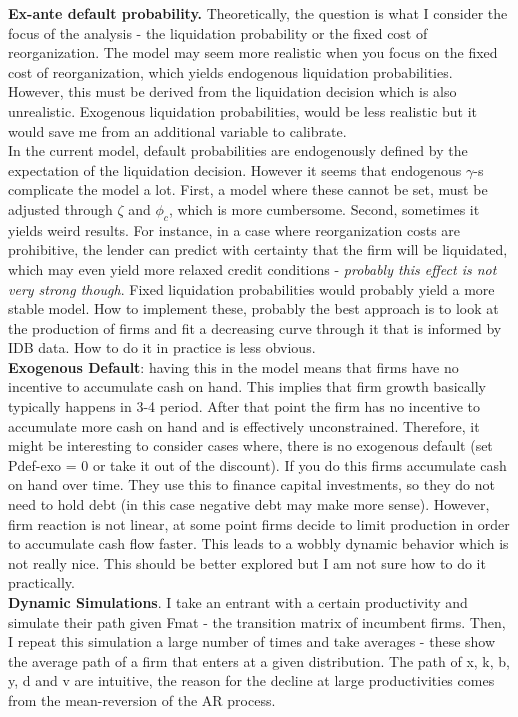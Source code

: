 \documentclass[12pt]{article}
\begin{document}
\textbf{Ex-ante default probability.} Theoretically, the question is what I consider the focus of the analysis - the liquidation probability or the fixed cost of reorganization. The model may seem more realistic when you focus on the fixed cost of reorganization, which yields endogenous liquidation probabilities. However, this must be derived from the liquidation decision which is also unrealistic. Exogenous liquidation probabilities, would be less realistic but it would save me from an additional variable to calibrate. \vspace{3mm} \\
In the current model, default probabilities are endogenously defined by the expectation of the liquidation decision. However it seems that endogenous $\gamma$-s complicate the model a lot. First, a model where these cannot be set, must be adjusted through $\zeta$ and $\phi_c$, which is more cumbersome. Second, sometimes it yields weird results. For instance, in a case where reorganization costs are prohibitive, the lender can predict with certainty that the firm will be liquidated, which may even yield more relaxed credit conditions - \textit{probably this effect is not very strong though}. Fixed liquidation probabilities would probably yield a more stable model.
How to implement these, probably the best approach is to look at the production of firms and fit a decreasing curve through it that is informed by IDB data. How to do it in practice is less obvious. \vspace{3mm} \\
\textbf{Exogenous Default}: having this in the model means that firms have no incentive to accumulate cash on hand. This implies that firm growth basically typically happens in 3-4 period. After that point the firm has no incentive to accumulate more cash on hand and is effectively unconstrained. Therefore, it might be interesting to consider cases where, there is no exogenous default (set Pdef-exo = 0 or take it out of the discount). If you do this firms accumulate cash on hand over time. They use this to finance capital investments, so they do not need to hold debt (in this case negative debt may make more sense). However, firm reaction is not linear, at some point firms decide to limit production in order to accumulate cash flow faster. This leads to a wobbly dynamic behavior which is not really nice. This should be better explored but I am not sure how to do it practically. \vspace{3mm} \\
\textbf{Dynamic Simulations}. I take an entrant with a certain productivity and simulate their path given Fmat - the transition matrix of incumbent firms. Then, I repeat this simulation a large number of times and take averages - these show the average path of a firm that enters at a given distribution. The path of x, k, b, y, d and v  are intuitive, the reason for the decline at large productivities comes from the mean-reversion of the AR process. \vspace{3mm} \\
\end{document}
